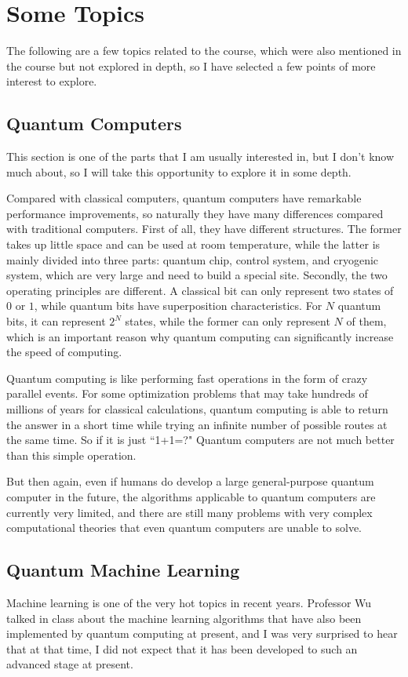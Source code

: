 \documentclass[11pt]{article}
\begin{document}
\section{Some Topics}
\qquad The following are a few topics related to the course, which were also mentioned in the course but not explored in depth, so I have selected a few points of more interest to explore.
\subsection{Quantum Computers}
\qquad This section is one of the parts that I am usually interested in, but I don't know much about, so I will take this opportunity to explore it in some depth.

Compared with classical computers, quantum computers have remarkable performance improvements, so naturally they have many differences compared with traditional computers. First of all, they have different structures. The former takes up little space and can be used at room temperature, while the latter is mainly divided into three parts: quantum chip, control system, and cryogenic system, which are very large and need to build a special site. Secondly, the two operating principles are different. A classical bit can only represent two states of $0$ or $1$, while quantum bits have superposition characteristics. For $N$ quantum bits, it can represent $2^N$ states, while the former can only represent $N$ of them, which is an important reason why quantum computing can significantly increase the speed of computing.

Quantum computing is like performing fast operations in the form of crazy parallel events. For some optimization problems that may take hundreds of millions of years for classical calculations, quantum computing is able to return the answer in a short time while trying an infinite number of possible routes at the same time. So if it is just ``1+1=?" Quantum computers are not much better than this simple operation.

But then again, even if humans do develop a large general-purpose quantum computer in the future, the algorithms applicable to quantum computers are currently very limited, and there are still many problems with very complex computational theories that even quantum computers are unable to solve.
\subsection{Quantum Machine Learning}
\qquad Machine learning is one of the very hot topics in recent years. Professor Wu talked in class about the machine learning algorithms that have also been implemented by quantum computing at present, and I was very surprised to hear that at that time, I did not expect that it has been developed to such an advanced stage at present.
\end{document}
